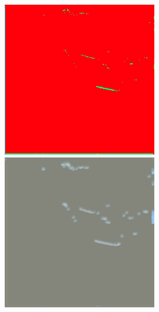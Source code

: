 \begin{figure}
    \includegraphics[width=\WnetPredictionsImageWidth]{images/wnet/46d-20/63585-prediction} \hfill
    \includegraphics[width=\WnetPredictionsImageWidth]{images/wnet/46d-20/63585-restored}


\end{figure}
